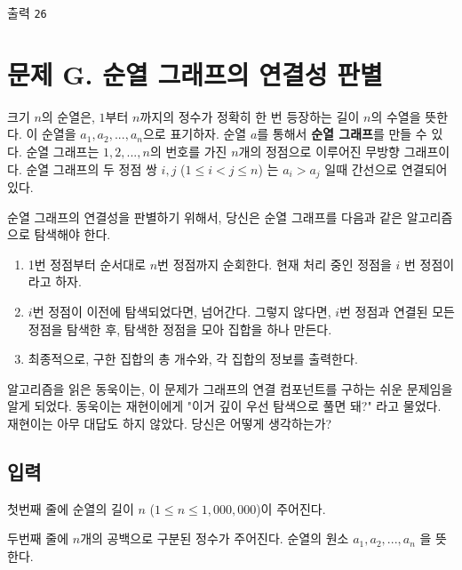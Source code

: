 \documentclass{article}
\begin{document}
출력
\bgroup\obeylines
\texttt{26	\newline}
\egroup

\newpage




\section{문제 G.  순열 그래프의 연결성 판별}
크기 $n$의 순열은, $1$부터 $n$까지의 정수가 정확히 한 번 등장하는 길이 $n$의 수열을 뜻한다. 이 순열을 $a_1, a_2, ..., a_n$으로 표기하자. 순열 $a$를 통해서 \textbf{순열 그래프}를 만들 수 있다. 순열 그래프는 $1, 2, ..., n$의 번호를 가진 $n$개의 정점으로 이루어진 무방향 그래프이다. 순열 그래프의 두 정점 쌍 $i, j$ ($1 \leq i < j \leq n$) 는 $a_i > a_j$ 일때 간선으로 연결되어 있다.  \newline

순열 그래프의 연결성을 판별하기 위해서, 당신은 순열 그래프를 다음과 같은 알고리즘으로 탐색해야 한다. 
\begin{enumerate}  
	\item 1번 정점부터 순서대로 $n$번 정점까지 순회한다. 현재 처리 중인 정점을 $i$ 번 정점이라고 하자.
	\item $i$번 정점이 이전에 탐색되었다면, 넘어간다. 그렇지 않다면, $i$번 정점과 연결된 모든 정점을 탐색한 후, 탐색한 정점을 모아 집합을 하나 만든다.
	\item 최종적으로, 구한 집합의 총 개수와, 각 집합의 정보를 출력한다.  
\end{enumerate}

알고리즘을 읽은 동욱이는, 이 문제가 그래프의 연결 컴포넌트를 구하는 쉬운 문제임을 알게 되었다. 동욱이는 재현이에게 "이거 깊이 우선 탐색으로 풀면 돼?" 라고 물었다. 재현이는 아무 대답도 하지 않았다. 당신은 어떻게 생각하는가?

\subsection{입력}
첫번째 줄에 순열의 길이 $n$ ($1 \leq n \leq 1,000,000$)이 주어진다. \newline

두번째 줄에 $n$개의 공백으로 구분된 정수가 주어진다. 순열의 원소 $a_1, a_2, ..., a_n$ 을 뜻한다.
\end{document}
